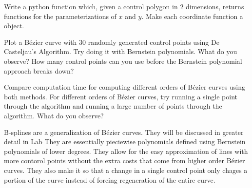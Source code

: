 \begin{problem}
Write a python function which, given a control polygon in $2$ dimensions, returns functions for the parameterizations of $x$ and $y$.
Make each coordinate function a  object.
\end{problem}

\begin{problem}
Plot a B\'{e}zier curve with 30 randomly generated control points using De Casteljau's Algorithm.
Try doing it with Bernstein polynomials.
What do you observe?
How many control points can you use before the Bernstein polynomial approach breaks down?

Compare computation time for computing different orders of B\'{e}zier curves using both methods.
For different orders of B\'{e}zier curves, try running a single point through the algorithm and running a large number of points through the algorithm.
What do you observe?
\end{problem}

\begin{comment}
\begin{problem}
Use your implementation of De Casteljau's algorithm to make a $20\times 20$ grid of B\'{e}zier curves representing the surface $sin(xy)$ on $[-\pi,\pi]\times [-pi,\pi]$.
Use the points where the gridlines intersect as the control points for each curve.
What do you observe?
\end{problem}
\end{comment}

B-splines are a generalization of B\'{e}zier curves.
They will be discussed in greater detail in Lab 
They are essentially pieciewise polynomials defined using Bernstein polynomials of lower degrees.
They allow for the easy approximation of lines with more contorol points without the extra costs that come from higher order B\'{e}zier curves.
They also make it so that a change in a single control point only chages a portion of the curve instead of forcing regeneration of the entire curve.
